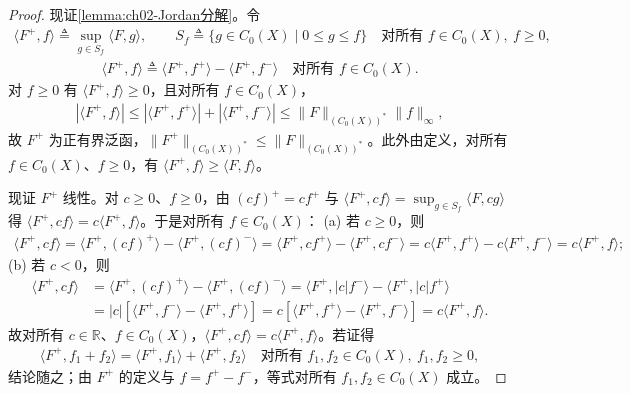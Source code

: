 \documentclass[../../main.tex]{subfiles}%
\begin{document}
\begin{proof}
现证\cref{lemma:ch02-Jordan分解}。令
\begin{align*}
\langle F^+,f\rangle\triangleq \sup_{g\in S_f}\langle F,g\rangle,\qquad
S_f\triangleq \{g\in C_0(X)\mid 0\leqslant g\leqslant f\}\quad\text{对所有 }f\in C_0(X),\ f\geqslant0,
\end{align*}
\begin{align*}
\langle F^+,f\rangle\triangleq \langle F^+,f^+\rangle-\langle F^+,f^-\rangle\quad\text{对所有 }f\in C_0(X).
\end{align*}
对 $f\geqslant0$ 有 $\langle F^+,f\rangle\geqslant0$，且对所有 $f\in C_0(X)$，
\begin{align*}
|\langle F^+,f\rangle|\leqslant|\langle F^+,f^+\rangle|+|\langle F^+,f^-\rangle|
\leqslant\|F\|_{(C_0(X))^*}\|f\|_\infty,
\end{align*}
故 $F^+$ 为正有界泛函，$\|F^+\|_{(C_0(X))^*}\leqslant\|F\|_{(C_0(X))^*}$。此外由定义，对所有 $f\in C_0(X)$、$f\geqslant0$，有 $\langle F^+,f\rangle\geqslant\langle F,f\rangle$。

现证 $F^+$ 线性。对 $c\geqslant0$、$f\geqslant0$，由 $(cf)^+=cf^+$ 与 $\langle F^+,cf\rangle=\sup_{g\in S_f}\langle F,cg\rangle$ 得 $\langle F^+,cf\rangle=c\langle F^+,f\rangle$。于是对所有 $f\in C_0(X)$：
(a) 若 $c\geqslant0$，则
\begin{align*}
\langle F^+,cf\rangle=\langle F^+,(cf)^+\rangle-\langle F^+,(cf)^-\rangle
=\langle F^+,cf^+\rangle-\langle F^+,cf^-\rangle
=c\langle F^+,f^+\rangle-c\langle F^+,f^-\rangle=c\langle F^+,f\rangle;
\end{align*}
(b) 若 $c<0$，则
\begin{align*}
\langle F^+,cf\rangle&=\langle F^+,(cf)^+\rangle-\langle F^+,(cf)^-\rangle
=\langle F^+,|c|f^-\rangle-\langle F^+,|c|f^+\rangle\\
&=|c|[\langle F^+,f^-\rangle-\langle F^+,f^+\rangle]
=c[\langle F^+,f^+\rangle-\langle F^+,f^-\rangle]=c\langle F^+,f\rangle.
\end{align*}
故对所有 $c\in\mathbb R$、$f\in C_0(X)$，$\langle F^+,cf\rangle=c\langle F^+,f\rangle$。若证得
\begin{align}
\langle F^+,f_1+f_2\rangle=\langle F^+,f_1\rangle+\langle F^+,f_2\rangle
\quad\text{对所有 }f_1,f_2\in C_0(X),\ f_1,f_2\geqslant0, \label{align:ch02-2.53}
\end{align}
结论随之；由 $F^+$ 的定义与 $f=f^+-f^-$，等式对所有 $f_1,f_2\in C_0(X)$ 成立。


\end{proof}
\end{document}
